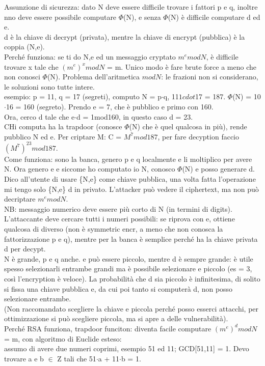 \documentclass[16px]{article}
\begin{document}
Assunzione di sicurezza: dato N deve essere difficile trovare i fattori p e q, inoltre nno deve essere possibile computare $\Phi$(N), e senza $\Phi$(N) è difficile computare d ed e.\\ d è la chiave di decrypt (privata), mentre la chiave di encrypt (pubblica) è la coppia (N,e).\\ Perché funziona: se ti do N,e ed un messaggio cryptato $m^emodN$, è difficile trovare x tale che $(m^e)^xmodN$ = m. Unico modo è fare brute force a meno che non conosci $\Phi$(N). Problema dell'aritmetica $modN$: le frazioni non si considerano, le soluzioni sono tutte intere.\\ esempio: p = 11, q = 17 (segreti), computo N = p$\cdot$q, 11$1cdot$17 = 187. $\Phi$(N) = 10$\cdot$16 = 160 (segreto). Prendo e = 7, che è pubblico e primo con 160.\\ Ora, cerco d tale che e$\cdot$d = 1mod160, in questo caso d = 23.\\ CHi computa ha la trapdoor (conosce $\Phi$(N) che è quel qualcosa in più), rende pubblico N ed e. Per criptare M: C = $M^7mod187$, per fare decyption faccio $(M^7)^23mod187$.\\ Come funziona: sono la banca, genero p e q localmente e li moltiplico per avere N. Ora genero e e siccome ho computato io N, conosco $\Phi$(N) e posso generare d. Dico all'utente di usare \{N,e\} come chiave pubblica, una volta fatta l'operazione mi tengo solo \{N,e\} d in privato. L'attacker può vedere il ciphertext, ma non può decriptare $m^emodN$.\\ NB: messaggio numerico deve essere più corto di N (in termini di digits).\\ L'attaccante deve cercare tutti i numeri possibili: se riprova con e, ottiene qualcosa di diverso (non è symmetric encr, a meno che non conosca la fattorizzazione p e q), mentre per la banca è semplice perché ha la chiave privata d per decypt.\\ N è grande, p e q anche. e può essere piccolo, mentre d è sempre grande: è utile spesso selezionarli entrambe grandi ma è possibile selezionare e piccolo (es = 3, così l'encryption è veloce). La probabilità che d sia piccolo è infinitesima, di solito si fissa una chiave pubblica e, da cui poi tanto si computerà d, non posso selezionare entrambe.\\ (Non raccomandato scegliere la chiave e piccola perché posso esserci attacchi, per ottimizzazione si può scegliere piccola, ma si apre a delle vulnerabilità).\\ Perché RSA funziona, trapdoor funciton: diventa facile computare $(m^e)^dmodN$ = m, con algoritmo di Euclide esteso:\\ assumo di avere due numeri coprimi, esempio 51 ed 11; GCD[51,11] = 1. Devo trovare a e b $\in$ Z tali che 51$\cdot$a + 11$\cdot$b = 1.\\
\end{document}

